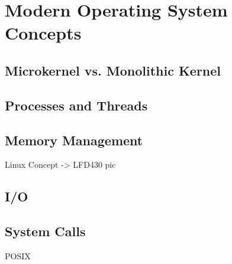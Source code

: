 
\chapter{Modern Operating System Concepts} \label{ch:modern-os-concepts}


\section{Microkernel vs. Monolithic Kernel} %

\section{Processes and Threads} %

\section{Memory Management} %
    Linux Concept -> LFD430 pic

\section{I/O} %

\section{System Calls} %
    POSIX
